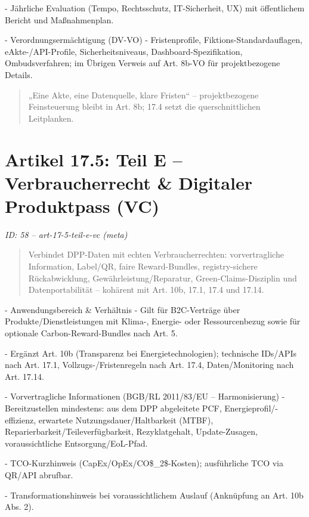 \documentclass[12pt,a4paper]{scrartcl}
\begin{document}
- Jährliche Evaluation (Tempo, Rechtsschutz, IT-Sicherheit, UX) mit öffentlichem Bericht und Maßnahmenplan.

- Verordnungsermächtigung (DV-VO)
- Fristenprofile, Fiktions-Standardauflagen, eAkte-/API-Profile, Sicherheitsniveaus, Dashboard-Spezifikation, Ombudsverfahren; im Übrigen Verweis auf Art. 8b-VO für projektbezogene Details.

{\footnotesize\begin{quote}
„Eine Akte, eine Datenquelle, klare Fristen“ -- projektbezogene Feinsteuerung bleibt in Art. 8b; 17.4 setzt die querschnittlichen Leitplanken.
\end{quote}}



\section[Artikel 17.5: Teil E -- Verbraucherrecht \& Digitaler Produktpass (VC)]{Artikel 17.5: Teil E -- Verbraucherrecht \& Digitaler Produktpass (VC)}
\noindent\textit{ID: 58 -- art-17-5-teil-e-vc (meta)}

\begin{quote}
Verbindet DPP-Daten mit echten Verbraucherrechten: vorvertragliche Information, Label/QR, faire Reward-Bundles, registry-sichere Rückabwicklung, Gewährleistung/Reparatur, Green-Claims-Disziplin und Datenportabilität -- kohärent mit Art. 10b, 17.1, 17.4 und 17.14.
\end{quote}

- Anwendungsbereich \& Verhältnis
- Gilt für B2C-Verträge über Produkte/Dienstleistungen mit Klima-, Energie- oder Ressourcenbezug sowie für optionale Carbon-Reward-Bundles nach Art. 5.

- Ergänzt Art. 10b (Transparenz bei Energietechnologien); technische IDs/APIs nach Art. 17.1, Vollzugs-/Fristenregeln nach Art. 17.4, Daten/Monitoring nach Art. 17.14.

- Vorvertragliche Informationen (BGB/RL 2011/83/EU -- Harmonisierung)
- Bereitzustellen mindestens: aus dem DPP abgeleitete PCF, Energieprofil/-effizienz, erwartete Nutzungsdauer/Haltbarkeit (MTBF), Reparierbarkeit/Teileverfügbarkeit, Rezyklatgehalt, Update-Zusagen, voraussichtliche Entsorgung/EoL-Pfad.

- TCO-Kurzhinweis (CapEx/OpEx/CO\$\_2\$-Kosten); ausführliche TCO via QR/API abrufbar.

- Transformationshinweis bei voraussichtlichem Auslauf (Anknüpfung an Art. 10b Abs. 2).
\end{document}
